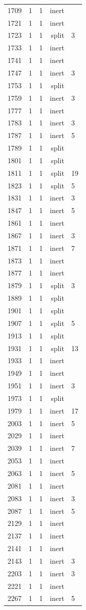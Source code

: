 \begin{longtable}{rrrrl}
1709 & 1 & 1 & inert &  \\
1721 & 1 & 1 & inert &  \\
1723 & 1 & 1 & split & 3 \\
1733 & 1 & 1 & inert &  \\
1741 & 1 & 1 & inert &  \\
1747 & 1 & 1 & inert & 3 \\
1753 & 1 & 1 & split &  \\
1759 & 1 & 1 & inert & 3 \\
1777 & 1 & 1 & inert &  \\
1783 & 1 & 1 & inert & 3 \\
1787 & 1 & 1 & inert & 5 \\
1789 & 1 & 1 & split &  \\
1801 & 1 & 1 & split &  \\
1811 & 1 & 1 & split & 19 \\
1823 & 1 & 1 & split & 5 \\
1831 & 1 & 1 & inert & 3 \\
1847 & 1 & 1 & inert & 5 \\
1861 & 1 & 1 & inert &  \\
1867 & 1 & 1 & inert & 3 \\
1871 & 1 & 1 & inert & 7 \\
1873 & 1 & 1 & inert &  \\
1877 & 1 & 1 & inert &  \\
1879 & 1 & 1 & split & 3 \\
1889 & 1 & 1 & split &  \\
1901 & 1 & 1 & split &  \\
1907 & 1 & 1 & split & 5 \\
1913 & 1 & 1 & split &  \\
1931 & 1 & 1 & split & 13 \\
1933 & 1 & 1 & inert &  \\
1949 & 1 & 1 & inert &  \\
1951 & 1 & 1 & inert & 3 \\
1973 & 1 & 1 & split &  \\
1979 & 1 & 1 & inert & 17 \\
2003 & 1 & 1 & inert & 5 \\
2029 & 1 & 1 & inert &  \\
2039 & 1 & 1 & inert & 7 \\
2053 & 1 & 1 & inert &  \\
2063 & 1 & 1 & inert & 5 \\
2081 & 1 & 1 & inert &  \\
2083 & 1 & 1 & inert & 3 \\
2087 & 1 & 1 & inert & 5 \\
2129 & 1 & 1 & inert &  \\
2137 & 1 & 1 & inert &  \\
2141 & 1 & 1 & inert &  \\
2143 & 1 & 1 & inert & 3 \\
2203 & 1 & 1 & inert & 3 \\
2221 & 1 & 1 & inert &  \\
2267 & 1 & 1 & inert & 5 \\

\end{longtable}
\normalsize
